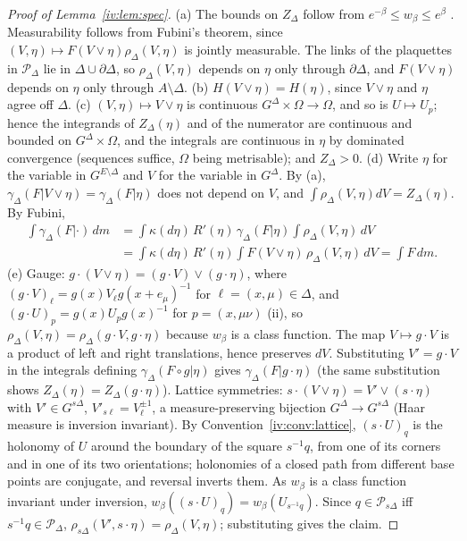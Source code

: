 \documentclass[11pt,a4paper]{article}
\theoremstyle{definition}
\theoremstyle{remark}
\newcommand{\cP}{\mathcal{P}}
\newcommand{\Flab}[2]{\cite[#1 \texttt{#2}]{F}}
\begin{document}
\begin{proof}[Proof of Lemma~\ref{iv:lem:spec}]
(a) The bounds on $Z_\Delta$ follow from $e^{-\beta}\le w_\beta\le e^\beta$ \Flab{eq.}{eq:w}. Measurability follows from
Fubini's theorem, since $(V,\eta)\mapsto F(V\vee\eta)\rho_\Delta(V,\eta)$ is jointly measurable. The links of the plaquettes
in $\cP_\Delta$ lie in $\Delta\cup\partial\Delta$, so $\rho_\Delta(V,\eta)$ depends on $\eta$ only through $\partial\Delta$,
and $F(V\vee\eta)$ depends on $\eta$ only through $A\setminus\Delta$. (b) $H(V\vee\eta)=H(\eta)$, since $V\vee\eta$ and
$\eta$ agree off $\Delta$. (c) $(V,\eta)\mapsto V\vee\eta$ is continuous $G^\Delta\times\Omega\to\Omega$, and so is
$U\mapsto U_p$; hence the integrands of $Z_\Delta(\eta)$ and of the numerator are continuous and bounded on
$G^\Delta\times\Omega$, and the integrals are continuous in $\eta$ by dominated convergence (sequences suffice, $\Omega$
being metrisable); and $Z_\Delta>0$. (d) Write $\eta$ for the variable in $G^{E\setminus\Delta}$ and $V$ for the variable in
$G^\Delta$. By (a), $\gamma_\Delta(F|V\vee\eta)=\gamma_\Delta(F|\eta)$ does not depend on $V$, and
$\int\rho_\Delta(V,\eta)dV=Z_\Delta(\eta)$. By Fubini,
\begin{align*}
\int\gamma_\Delta(F|\cdot)\,dm&=\int\kappa(d\eta)\,R'(\eta)\,\gamma_\Delta(F|\eta)\int\rho_\Delta(V,\eta)\,dV\\
&=\int\kappa(d\eta)\,R'(\eta)\int F(V\vee\eta)\,\rho_\Delta(V,\eta)\,dV=\int F\,dm .
\end{align*}
(e) Gauge: $g\cdot(V\vee\eta)=(g\cdot V)\vee(g\cdot\eta)$, where $(g\cdot V)_\ell=g(x)V_\ell g(x+e_\mu)^{-1}$ for
$\ell=(x,\mu)\in\Delta$, and $(g\cdot U)_p=g(x)U_pg(x)^{-1}$ for $p=(x,\mu\nu)$ \Flab{Theorem}{thm:basic}(ii), so
$\rho_\Delta(V,\eta)=\rho_\Delta(g\cdot V,g\cdot\eta)$ because $w_\beta$ is a class function. The map $V\mapsto g\cdot V$
is a product of left and right translations, hence preserves $dV$. Substituting $V'=g\cdot V$ in the integrals defining
$\gamma_\Delta(F\circ g|\eta)$ gives $\gamma_\Delta(F|g\cdot\eta)$ (the same substitution shows $Z_\Delta(\eta)=Z_\Delta(g\cdot\eta)$).
Lattice symmetries: $s\cdot(V\vee\eta)=V'\vee(s\cdot\eta)$ with $V'\in G^{s\Delta}$, $V'_{s\ell}=V_\ell^{\pm1}$, a
measure-preserving bijection $G^\Delta\to G^{s\Delta}$ (Haar measure is inversion invariant). By
Convention~\ref{iv:conv:lattice}, $(s\cdot U)_q$ is the holonomy of $U$ around the boundary of the square $s^{-1}q$, from
one of its corners and in one of its two orientations; holonomies of a closed path from different base points are conjugate,
and reversal inverts them. As $w_\beta$ is a class function invariant under inversion, $w_\beta((s\cdot U)_q)=w_\beta(U_{s^{-1}q})$.
Since $q\in\cP_{s\Delta}$ iff $s^{-1}q\in\cP_\Delta$, $\rho_{s\Delta}(V',s\cdot\eta)=\rho_\Delta(V,\eta)$; substituting gives
the claim.
\end{proof}
\end{document}

